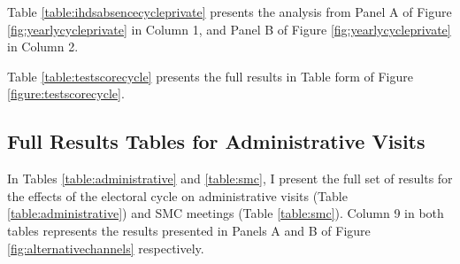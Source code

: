 \documentclass[hidelinks, 12pt, article, oneside]{memoir}
\begin{document}
Table \ref{table:ihdsabsencecycleprivate} presents the analysis from Panel A of Figure \ref{fig:yearlycycleprivate} in Column 1, and Panel B of Figure \ref{fig:yearlycycleprivate} in Column 2.

\SingleSpacing

\DoubleSpacing

Table \ref{table:testscorecycle} presents the full results in Table form of Figure \ref{figure:testscorecycle}.

\SingleSpacing

\DoubleSpacing

\clearpage

\subsection*{Full Results Tables for Administrative Visits}

In Tables \ref{table:administrative} and \ref{table:smc}, I present the full set of results for the effects of the electoral cycle on administrative visits (Table \ref{table:administrative}) and SMC meetings (Table \ref{table:smc}).  Column 9 in both tables represents the results presented in Panels A and B of Figure \ref{fig:alternativechannels} respectively.

\SingleSpacing



\DoubleSpacing

\clearpage

\renewcommand\bibname{Supplementary Materials References}


\end{document}
